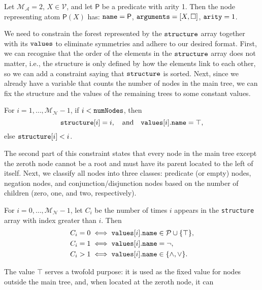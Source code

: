 \documentclass[runningheads]{llncs}
\newcommand{\variable}[1]{\texttt{\textup{#1}}}
\newcommand{\predicates}{\mathcal{P}}
\newcommand{\variables}{\mathcal{V}}
\newcommand{\maxArity}{\mathcal{M}_{\mathcal{A}}}
\newcommand{\maxNumNodes}{\mathcal{M}_{\mathcal{N}}}
\begin{document}
\begin{example}
  Let $\maxArity{} = 2$, $X \in \variables{}$, and let $\mathsf{P}$ be a
  predicate with arity 1. Then the node representing atom $\mathsf{P}(X)$ has:
    $\variable{name} = \mathsf{P}$, $\variable{arguments} = [X, \Box]$,
    $\variable{arity} = 1$.
\end{example}

We need to constrain the forest represented by the $\variable{structure}$
array together with its $\variable{values}$ to eliminate symmetries and adhere
to our desired format. First, we can recognise that the order of the elements in
the $\variable{structure}$ array does not matter, i.e., the structure is only
defined by how the elements link to each other, so we can add a constraint
saying that $\variable{structure}$ is sorted. Next, since we already have a
variable that counts the number of nodes in the main tree, we can fix the
structure and the values of the remaining trees to some constant values.
\begin{constraint}
  For $i = 1, \dots, \maxNumNodes{} - 1$, if $i < \variable{numNodes}$, then
  \[
    \variable{structure}[i] = i, \quad \text{and} \quad
    \variable{values}[i].\variable{name} = \top,
  \]
  else $\variable{structure}[i] < i$.
\end{constraint}
The second part of this constraint states that every node in the main tree
except the zeroth node cannot be a root and must have its parent located to
the left of itself. Next, we classify all nodes into three classes: predicate
(or empty) nodes, negation nodes, and conjunction/disjunction nodes based on the
number of children (zero, one, and two, respectively).
\begin{constraint} \label{constraint:node_types}
  For $i = 0, \dots, \maxNumNodes{} - 1$, let $C_i$ be the number of times $i$
  appears in the \variable{structure} array with index greater than $i$. Then
  \begin{align*}
    C_i = 0 &\iff \variable{values}[i].\variable{name} \in \predicates{} \cup \{ \top \},\\
    C_i = 1 &\iff \variable{values}[i].\variable{name} = \neg,\\
    C_i > 1 &\iff \variable{values}[i].\variable{name} \in \{ \land, \lor \}.
  \end{align*}
\end{constraint}
The value $\top$ serves a twofold purpose: it is used as the fixed value for
nodes outside the main tree, and, when located at the zeroth node, it can
\end{document}
